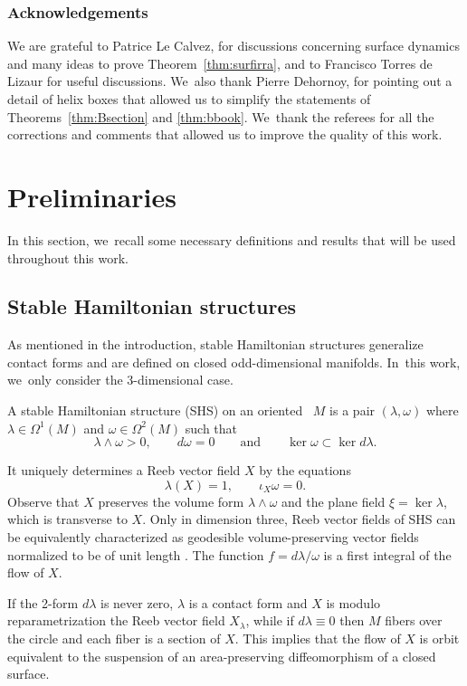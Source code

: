 \subsubsection*{Acknowledgements}
We are grateful to Patrice Le Calvez, for discussions concerning surface dynamics and many ideas to prove Theorem~\ref{thm:surfirra}, and to Francisco Torres de Lizaur for useful discussions. We~also thank Pierre Dehornoy, for pointing out a detail of helix boxes that allowed us to simplify the statements of Theorems~\ref{thm:Bsection} and \ref{thm:bbook}. We~thank the referees for all the corrections and comments that allowed us to improve the quality of this work.

\section{Preliminaries}\label{sec:prelim}

In this section, we~recall some necessary definitions and results that will be used throughout this work.

\subsection{Stable Hamiltonian structures}\label{ss:SHS}

As mentioned in the introduction, stable Hamiltonian structures generalize contact forms and are defined on closed odd-dimensional manifolds. In~this work, we~only consider the 3-dimensional case.

\begin{defi}
A stable Hamiltonian structure (SHS) on an oriented \threemanifold~$M$ is a pair $(\lambda,\omega)$ where $\lambda \in \Omega^1(M)$ and $\omega \in \Omega^2(M)$ such that
\[
\lambda\wedge \omega>0, \qquad d\omega=0 \qquad \mbox{and} \qquad \ker \omega \subset \ker d\lambda.
\]
\end{defi}

It uniquely determines a Reeb vector field $X$ by the equations
\[
\lambda(X)=1,\qquad \iota_X\omega=0.
\]
Observe that $X$ preserves the volume form $\lambda\wedge \omega$ and the plane field $\xi=\ker \lambda$, which is transverse to $X$. Only in dimension three, Reeb vector fields of SHS can be equivalently characterized as geodesible volume-preserving vector fields normalized to be of unit length \cite{Re}. The function $f=d\lambda/\omega$ is a first integral of the flow of $X$.

If the 2-form $d\lambda$ is never zero, $\lambda$ is a contact form and $X$ is modulo reparametrization the Reeb vector field $X_\lambda$, while if $d\lambda\equiv 0$ then $M$ fibers over the circle and each fiber is a section of $X$. This implies that the flow of $X$ is orbit equivalent to
the suspension of an area-preserving diffeomorphism of a closed surface.

